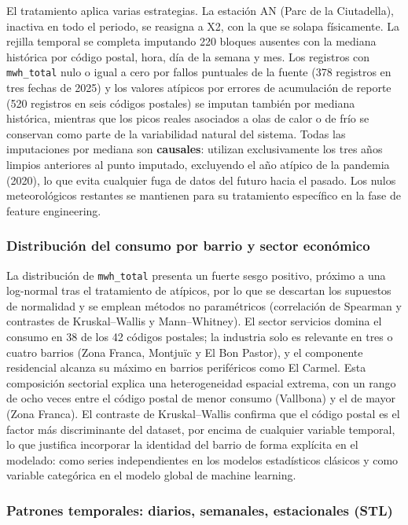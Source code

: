 \documentclass[12pt, a4paper]{article}
\begin{document}
El tratamiento aplica varias estrategias. La estación AN (Parc de la Ciutadella), inactiva en todo el periodo, se reasigna a X2, con la que se solapa físicamente. La rejilla temporal se completa imputando 220 bloques ausentes con la mediana histórica por código postal, hora, día de la semana y mes. Los registros con \texttt{mwh\_total} nulo o igual a cero por fallos puntuales de la fuente (378 registros en tres fechas de 2025) y los valores atípicos por errores de acumulación de reporte (520 registros en seis códigos postales) se imputan también por mediana histórica, mientras que los picos reales asociados a olas de calor o de frío se conservan como parte de la variabilidad natural del sistema. Todas las imputaciones por mediana son \textbf{causales}: utilizan exclusivamente los tres años limpios anteriores al punto imputado, excluyendo el año atípico de la pandemia (2020), lo que evita cualquier fuga de datos del futuro hacia el pasado. Los nulos meteorológicos restantes se mantienen para su tratamiento específico en la fase de feature engineering.

\subsubsection{Distribución del consumo por barrio y sector económico}

La distribución de \texttt{mwh\_total} presenta un fuerte sesgo positivo, próximo a una log-normal tras el tratamiento de atípicos, por lo que se descartan los supuestos de normalidad y se emplean métodos no paramétricos (correlación de Spearman y contrastes de Kruskal--Wallis y Mann--Whitney). El sector servicios domina el consumo en 38 de los 42 códigos postales; la industria solo es relevante en tres o cuatro barrios (Zona Franca, Montjuïc y El Bon Pastor), y el componente residencial alcanza su máximo en barrios periféricos como El Carmel. Esta composición sectorial explica una heterogeneidad espacial extrema, con un rango de ocho veces entre el código postal de menor consumo (Vallbona) y el de mayor (Zona Franca). El contraste de Kruskal--Wallis confirma que el código postal es el factor más discriminante del dataset, por encima de cualquier variable temporal, lo que justifica incorporar la identidad del barrio de forma explícita en el modelado: como series independientes en los modelos estadísticos clásicos y como variable categórica en el modelo global de machine learning.

\subsubsection{Patrones temporales: diarios, semanales, estacionales (STL)}
\end{document}
